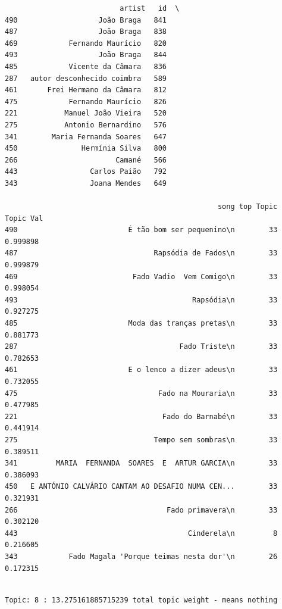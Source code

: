 \documentclass[11pt]{article}
\begin{document}
    
    \begin{verbatim}
                           artist   id  \
490                   João Braga   841   
487                   João Braga   838   
469            Fernando Maurício   820   
493                   João Braga   844   
485            Vicente da Câmara   836   
287   autor desconhecido coimbra   589   
461       Frei Hermano da Câmara   812   
475            Fernando Maurício   826   
221           Manuel João Vieira   520   
275           Antonio Bernardino   576   
341        Maria Fernanda Soares   647   
450               Hermínia Silva   800   
266                       Camané   566   
443                 Carlos Paião   792   
343                 Joana Mendes   649   

                                                  song top Topic  Topic Val  
490                          É tão bom ser pequenino\n        33   0.999898  
487                                Rapsódia de Fados\n        33   0.999879  
469                           Fado Vadio  Vem Comigo\n        33   0.998054  
493                                         Rapsódia\n        33   0.927275  
485                          Moda das tranças pretas\n        33   0.881773  
287                                      Fado Triste\n        33   0.782653  
461                          E o lenco a dizer adeus\n        33   0.732055  
475                                 Fado na Mouraria\n        33   0.477985  
221                                  Fado do Barnabé\n        33   0.441914  
275                                Tempo sem sombras\n        33   0.389511  
341         MARIA  FERNANDA  SOARES  E  ARTUR GARCIA\n        33   0.386093  
450   E ANTÓNIO CALVÁRIO CANTAM AO DESAFIO NUMA CEN...        33   0.321931  
266                                   Fado primavera\n        33   0.302120  
443                                        Cinderela\n         8   0.216605  
343            Fado Magala 'Porque teimas nesta dor'\n        26   0.172315  
    \end{verbatim}

    
    \begin{Verbatim}[commandchars=\\\{\}]

Topic: 8 : 13.275161885715239 total topic weight - means nothing

    \end{Verbatim}
\end{document}
